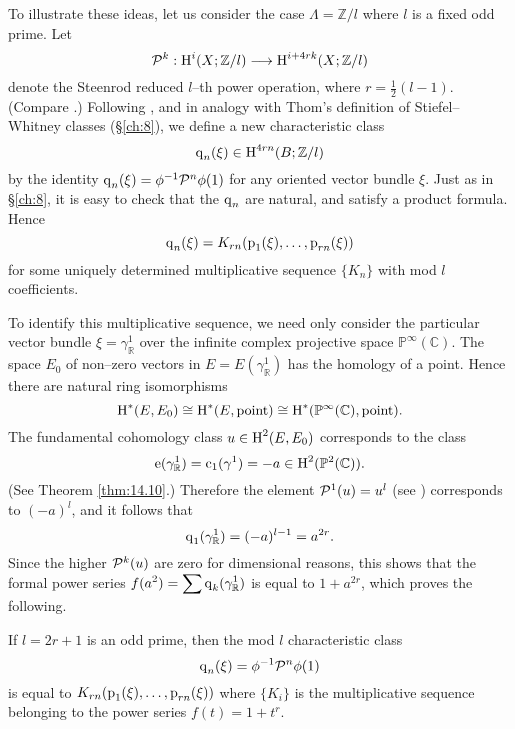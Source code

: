 \documentclass[../main]{subfiles}
\begin{document}
To illustrate these ideas, let us consider the case $\Lambda = {\mathbb Z}/l$ where $l$ is a fixed odd prime. Let \[{\mathcal{P}}^k : \operatorname{H}^i(X; {\mathbb Z}/l) \longrightarrow \operatorname{H}^{i + 4rk} (X; {\mathbb Z}/l)\] denote the Steenrod reduced $l$--th power operation, where $r = \frac 1 2 (l - 1)$. (Compare \cite{steenrod1962cohomology}.) Following \cite{wu1948}, and in analogy with Thom's definition of Stiefel--Whitney classes (\S\ref{ch:8}), we define a new characteristic class \[\operatorname{q}_n(\xi) \in \operatorname{H}^{4rn}(B; {\mathbb Z}/l)\] by the identity $\operatorname{q}_n(\xi) = \phi^{-1} {\mathcal{P}}^n \phi(1)$ for any oriented vector bundle $\xi$. Just as in \S\ref{ch:8}, it is easy to check that the $\operatorname{q}_n$ are natural, and satisfy a product formula. Hence \[\operatorname{q}_n(\xi) = K_{rn}(\operatorname{p}_1(\xi), \ldots, \operatorname{p}_{rn}(\xi))\] for some uniquely determined multiplicative sequence $\{K_n\}$ with mod $l$ coefficients. 

To identify this multiplicative sequence, we need only consider the particular vector bundle $\xi = \gamma_{\mathbb R}^1$ over the infinite complex projective space ${\mathbb P}^\infty(\mathbb C)$. The space $E_0$ of non--zero vectors in $E = E(\gamma_{\mathbb R}^1)$ has the homology of a point. Hence there are natural ring isomorphisms \[\operatorname{H}^\ast(E, E_0) \cong \operatorname{H}^\ast(E, \text{point}) \cong \operatorname{H}^\ast({\mathbb P}^\infty(\mathbb C), \text{point}).\] The fundamental cohomology class $u \in \operatorname{H}^2(E, E_0)$ corresponds to the class \[\operatorname{e}(\gamma_{\mathbb R}^1) = \operatorname{c}_1(\gamma^1) = -a \in \operatorname{H}^2({\mathbb P}^2(\mathbb C)).\] 
(See Theorem \ref{thm:14.10}.) Therefore the element ${\mathcal{P}}^1(u) = u^l$ (see \cite[p. 76]{steenrod1962cohomology}) corresponds to $(-a)^l$, and it follows that \[\operatorname{q}_1(\gamma_{\mathbb R}^1) = (-a)^{l - 1} = a^{2r}.\] Since the higher ${\mathcal{P}}^k(u)$ are zero for dimensional reasons, this shows that the formal power series $\displaystyle f(a^2) = \sum \operatorname{q}_k(\gamma_{\mathbb R}^1)$ is equal to $1 + a^{2r}$, which proves the following.

\begin{theorem}[Wu]
If $l = 2r + 1$ is an odd prime, then the mod $l$ characteristic class \[\operatorname{q}_n(\xi) = \phi^{-1} {\mathcal{P}}^n \phi(1)\] is equal to $K_{rn}(\operatorname{p}_1(\xi), \ldots, \operatorname{p}_{rn}(\xi))$ where $\{K_i\}$ is the multiplicative sequence belonging to the power series $f(t) = 1 + t^r$. 
\end{theorem}
\end{document}
